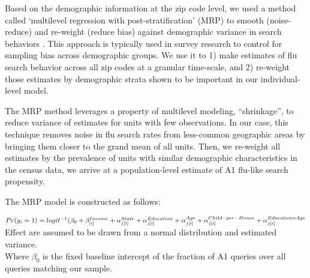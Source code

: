 \documentclass[12pt]{article}
\begin{document}
Based on the demographic information at the zip code level, we used a method called `multilevel regression with post-stratification' (MRP) to smooth (noise-reduce) and re-weight (reduce bias) against demographic variance in search behaviors \citep{gelman_and_little_1997, park_gelman_bafumi_2004}. This approach is typically used in survey research to control for sampling bias across demographic groups. We use it to 1) make estimates of flu search behavior across all zip codes at a granular time-scale, and 2) re-weight those estimates by demographic strata shown to be important in our individual-level model.

The MRP method leverages a property of multilevel modeling, ``shrinkage'', to reduce variance of estimates for units with few observations. In our case, this technique removes noise in flu search rates from less-common geographic areas by bringing them closer to the grand mean of all units. Then, we re-weight all estimates by the prevalence of units with similar demographic characteristics in the census data, we arrive at a population-level estimate of A1 flu-like search propensity.

The MRP model is constructed as follows:

$Pr(y_i = 1) = logit^{-1}( \beta_0  + \beta_{[i]}^{Income}
+ \alpha_{j[i]}^{State}
+ \alpha_{j[i]}^{Education}
+ \alpha_{j[i]}^{Age} \\
+ \alpha_{j[i]}^{Child-per-House}
+ \alpha_{j[i]}^{Education*Age} $
\\

Effect are assumed to be drawn from a normal distribution and estimated variance. \\


Where $\beta_0$ is the fixed baseline intercept of the fraction of A1 queries over all queries matching our sample.
\end{document}
